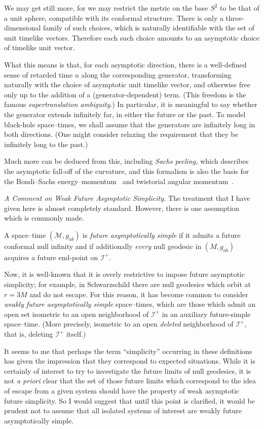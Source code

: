 \documentclass[12pt]{article}
\newcommand{\scrif}{{{\mathscr I}^{+}}}
\newcommand{\MM}{{\mathscr M}}
\begin{document}
We may get still more, for we may restrict the metric on the base $S^2$ to be that of a unit sphere, compatible with its conformal structure.  There is only a three-dimensional family of such choices, which is naturally identifiable with the set of unit timelike vectors.  Therefore each such choice amounts to an asymptotic choice of timelike unit vector.

What this means is that, for each asymptotic direction, there is a well-defined sense of retarded time $u$ along the corresponding generator, transforming naturally with the choice of asymptotic unit timelike vector, and otherwise free only up to the addition of a (generator-dependent) term.
(This freedom is the famous {\em supertranslation ambiguity}.)  In particular, it is meaningful to say whether the generator extends infinitely far, in either the future or the past.  To model 
black-hole space--times, we shall assume that the generators are infinitely long in both directions.  (One might consider relaxing the requirement that they be infinitely long to the past.)

Much more can be deduced from this, including {\em Sachs peeling,} which describes the asymptotic fall-off of the curvature, and this formalism is also the basis for the Bondi--Sachs energy--momentum~\citep{Penrose:1986ca} and twistorial angular momentum~\citep{Helfer:2007}.


{\em A Comment on Weak Future Asymptotic Simplicity.   }
The treatment that I have given here is almost completely standard.  However, there is one assumption which is commonly made.

A space--time $(\MM ,g_{ab})$ is {\em future asymptotically simple} if it admits a future conformal null infinity and if additionally
{\em every} null geodesic in $(M,g_{ab})$ acquires a future end-point on $\scrif$.

Now, it is well-known that it is overly restrictive to impose future asymptotic simplicity; for example, in Schwarzschild there are null geodesics which orbit at $r=3M$ and do not escape.  
For this reason, it has become common to consider {\em weakly future asymptotically simple} space--times, which are those which admit an open set isometric to an open neighborhood of $\scrif$ in an auxiliary future-simple space--time.  (More precisely, isometric to an open {\em deleted} neighborhood of $\scrif$, that is, deleting $\scrif$ itself.)

It seems to me that perhaps the term ``simplicity'' occurring in these definitions has given the impression that they correspond to expected situations.  While it is certainly of interest to try to investigate the future limits of null geodesics, it is not {\em a priori} clear that the set of those future limits which correspond to the idea of escape from a given system should have the property of weak asymptotic future simplicity.  So I would suggest that until this point is clarified, it would be prudent not to assume that all isolated systems of interest are weakly future asymptotically simple. 
\end{document}
